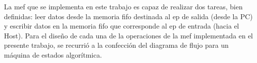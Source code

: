 %			
%
%
La \acrfull{mef} que se implementa en este trabajo es capaz de realizar dos tareas, bien definidas: leer datos desde la memoria \acrshort{fifo} destinada al \acrshort{ep} de salida (desde la PC) y escribir datos en la memoria \acrshort{fifo} que corresponde al \acrshort{ep} de entrada (hacia el Host). 
Para el diseño de cada una de la operaciones de la \acrshort{mef} implementada en el presente trabajo, se recurrió a la confección del diagrama de flujo para un máquina de estados algorítmica.


